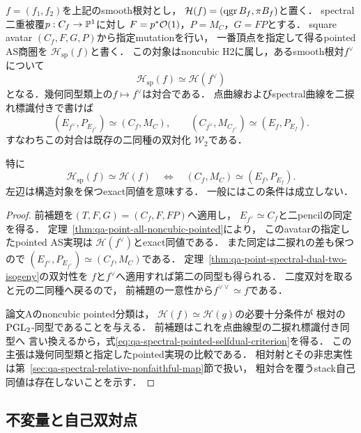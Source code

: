 \begin{theorem}
\label{thm:qa-spectral-avatar-pointed-involution}
$f=(f_1,f_2)$を上記のsmooth根対とし，
$\mathcal H(f)=(\operatorname{qgr} B_f,\pi B_f)$と置く．
spectral二重被覆$p:C_f\to\mathbb P^1$に対し
$F=p^*\mathcal O(1)$，$P=M_C$，$G=FP$とする．
square avatar $(C_f,F,G,P)$から指定mutationを行い，
一番頂点を指定して得るpointed AS商圏を
$\mathcal H_{\mathrm{sp}}(f)$と書く．
この対象はnoncubic H2に属し，あるsmooth根対$f^\vee$について
\[
\mathcal H_{\mathrm{sp}}(f)\simeq\mathcal H(f^\vee)
\]
となる．幾何同型類上の$f\mapsto f^\vee$は対合である．
点曲線およびspectral曲線を二捩れ標識付きで書けば
\[
(E_{f^\vee},P_{E_{f^\vee}})\simeq(C_f,M_C),\qquad
(C_{f^\vee},M_{C_{f^\vee}})\simeq(E_f,P_{E_f}).
\]
すなわちこの対合は既存の二同種の双対化
$\mathcal W_2$である．

特に
\begin{equation}
\mathcal H_{\mathrm{sp}}(f)\simeq\mathcal H(f)
\quad\Longleftrightarrow\quad
(C_f,M_C)\simeq(E_f,P_{E_f}).
\label{eq:qa-spectral-pointed-selfdual-criterion}
\end{equation}
左辺は構造対象を保つexact同値を意味する．
一般にはこの条件は成立しない．
\end{theorem}
\begin{proof}
前補題を$(T,F,G)=(C_f,F,FP)$へ適用し，
$E_{f^\vee}\simeq C_f$と二pencilの同定を得る．
定理~\ref{thm:qa-point-all-noncubic-pointed}により，
このavatarの指定したpointed AS実現は
$\mathcal H(f^\vee)$とexact同値である．
また同定は二捩れの差も保つので
$(E_{f^\vee},P_{E_{f^\vee}})\simeq(C_f,M_C)$である．
定理~\ref{thm:qa-point-spectral-dual-two-isogeny}の双対性を
$f$と$f^\vee$へ適用すれば第二の同型も得られる．
二度双対を取ると元の二同種へ戻るので，
前補題の一意性から$f^{\vee\vee}\simeq f$である．

論文Aのnoncubic pointed分類は，
$\mathcal H(f)\simeq\mathcal H(g)$の必要十分条件が
根対の$\operatorname{PGL}_2$-同型であることを与える．
前補題はこれを点曲線型の二捩れ標識付き同型へ
言い換えるから，式\eqref{eq:qa-spectral-pointed-selfdual-criterion}を得る．
この主張は幾何同型類と指定したpointed実現の比較である．
相対射とその非忠実性は第~\ref{sec:qa-spectral-relative-nonfaithful-map}節で扱い，
粗対合を覆うstack自己同値は存在しないことを示す．
\end{proof}

\subsection{不変量と自己双対点}

